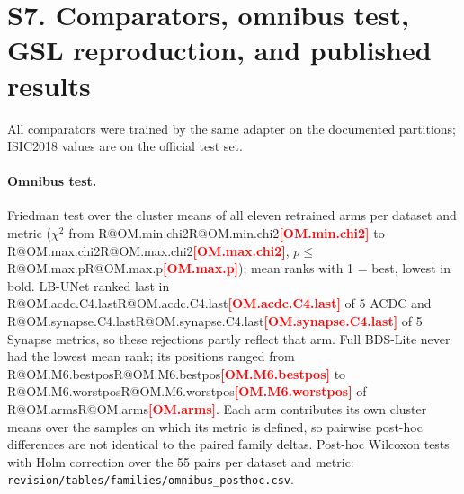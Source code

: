 \documentclass[10pt]{article}
\makeatletter
\newcommand{\R}[1]{\ifcsname R@#1\endcsname\csname R@#1\endcsname\else\textbf{\textcolor{red}{[#1]}}\fi}
\makeatother
\begin{document}
\clearpage
\section*{S7. Comparators, omnibus test, GSL reproduction, and published results}
All comparators were trained by the same adapter on the documented partitions; ISIC2018 values are on the official test set.
\begin{table}[ht]\centering
\resizebox{\linewidth}{!}{}
\caption{Comparator and retrained-reference means (three seeds; mean $\pm$ seed SD).}
\end{table}
\begin{table}[ht]\centering
\resizebox{\linewidth}{!}{}
\caption{Oriented mean differences of comparators against U-Net (upper panel) and full BDS-Lite (lower panel); $^{*}$Holm $p<0.05$ within family and dataset with CI excluding zero.}
\end{table}
\begin{table}[ht]\centering
\resizebox{\linewidth}{!}{}
\caption{Comparators versus retrained U-Net. Holm correction over all comparator--metric tests within dataset.}
\end{table}
\begin{table}[ht]\centering
\resizebox{\linewidth}{!}{}
\caption{Comparators versus retrained BDS-Lite; positive values favor the comparator.}
\end{table}

\paragraph{Omnibus test.} Friedman test over the cluster means of all eleven retrained arms per dataset and metric ($\chi^2$ from \R{OM.min.chi2} to \R{OM.max.chi2}, $p\le$\,\R{OM.max.p}); mean ranks with 1 = best, lowest in bold. LB-UNet ranked last in \R{OM.acdc.C4.last} of 5 ACDC and \R{OM.synapse.C4.last} of 5 Synapse metrics, so these rejections partly reflect that arm. Full BDS-Lite never had the lowest mean rank; its positions ranged from \R{OM.M6.bestpos} to \R{OM.M6.worstpos} of \R{OM.arms}. Each arm contributes its own cluster means over the samples on which its metric is defined, so pairwise post-hoc differences are not identical to the paired family deltas. Post-hoc Wilcoxon tests with Holm correction over the 55 pairs per dataset and metric: \texttt{revision/tables/families/omnibus\_posthoc.csv}.
\begin{table}[ht]\centering
\resizebox{\linewidth}{!}{}
\caption{Friedman $\chi^2$, $p$ and mean ranks of all retrained arms.}
\end{table}
\end{document}
